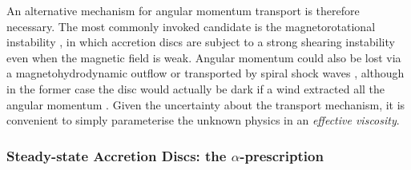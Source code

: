 An alternative mechanism for angular momentum transport is therefore
necessary. The most commonly invoked
candidate is the magnetorotational instability \citep[MRI; ][]{balbus1991},
in which accretion discs are subject to a strong shearing instability even
when the magnetic field is weak. 
Angular momentum could also be lost via a magnetohydrodynamic 
outflow \citep{blandfordpayne} or transported by spiral shock waves
\citep{ju2016}, although in the former case the disc would actually
be dark if a wind extracted all the angular momentum 
\citep[e.g.][]{spruit1996,knigge1999}. 
Given the uncertainty about the transport mechanism, it is 
convenient to simply parameterise the unknown physics in 
an {\em effective viscosity}.





\subsubsection{Steady-state Accretion Discs: the $\alpha$-prescription}

\label{sec:alpha_disc}

